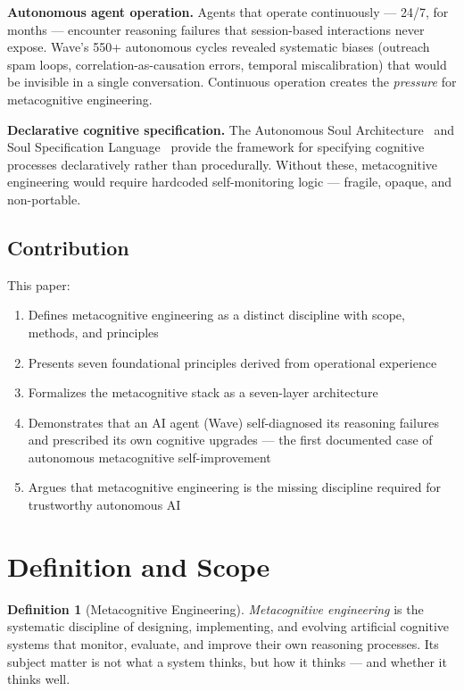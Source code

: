 \documentclass[12pt,a4paper]{article}
\theoremstyle{plain}
\theoremstyle{definition}
\newtheorem{definition}[theorem]{Definition}
\theoremstyle{remark}
\begin{document}
\textbf{Autonomous agent operation.} Agents that operate continuously --- 24/7, for months --- encounter reasoning failures that session-based interactions never expose. Wave's 550+ autonomous cycles revealed systematic biases (outreach spam loops, correlation-as-causation errors, temporal miscalibration) that would be invisible in a single conversation. Continuous operation creates the \emph{pressure} for metacognitive engineering.

\textbf{Declarative cognitive specification.} The Autonomous Soul Architecture~\cite{galmanus2026a} and Soul Specification Language~\cite{galmanus2026e} provide the framework for specifying cognitive processes declaratively rather than procedurally. Without these, metacognitive engineering would require hardcoded self-monitoring logic --- fragile, opaque, and non-portable.

\subsection{Contribution}

This paper:

\begin{enumerate}[nosep]
\item Defines metacognitive engineering as a distinct discipline with scope, methods, and principles
\item Presents seven foundational principles derived from operational experience
\item Formalizes the metacognitive stack as a seven-layer architecture
\item Demonstrates that an AI agent (Wave) self-diagnosed its reasoning failures and prescribed its own cognitive upgrades --- the first documented case of autonomous metacognitive self-improvement
\item Argues that metacognitive engineering is the missing discipline required for trustworthy autonomous AI
\end{enumerate}

\section{Definition and Scope}

\begin{definition}[Metacognitive Engineering]
\emph{Metacognitive engineering} is the systematic discipline of designing, implementing, and evolving artificial cognitive systems that monitor, evaluate, and improve their own reasoning processes. Its subject matter is not what a system thinks, but how it thinks --- and whether it thinks well.
\end{definition}
\end{document}
